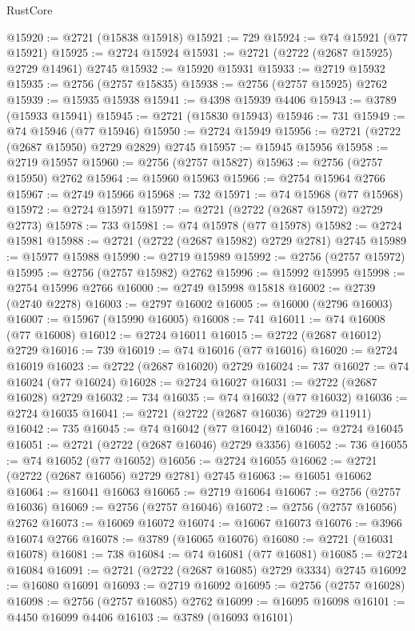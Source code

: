\begin{lexlean}{RustCore}
\begin{coremodule}
@15920 := @2721 (@15838 @15918)
@15921 := 729
@15924 := @74 @15921 (@77 @15921)
@15925 := @2724 @15924
@15931 := @2721 (@2722 (@2687 @15925) @2729 @14961) @2745
@15932 := @15920 @15931
@15933 := @2719 @15932
@15935 := @2756 (@2757 @15835)
@15938 := @2756 (@2757 @15925) @2762
@15939 := @15935 @15938
@15941 := @4398 @15939 @4406
@15943 := @3789 (@15933 @15941)
@15945 := @2721 (@15830 @15943)
@15946 := 731
@15949 := @74 @15946 (@77 @15946)
@15950 := @2724 @15949
@15956 := @2721 (@2722 (@2687 @15950) @2729 @2829) @2745
@15957 := @15945 @15956
@15958 := @2719 @15957
@15960 := @2756 (@2757 @15827)
@15963 := @2756 (@2757 @15950) @2762
@15964 := @15960 @15963
@15966 := @2754 @15964 @2766
@15967 := @2749 @15966
@15968 := 732
@15971 := @74 @15968 (@77 @15968)
@15972 := @2724 @15971
@15977 := @2721 (@2722 (@2687 @15972) @2729 @2773)
@15978 := 733
@15981 := @74 @15978 (@77 @15978)
@15982 := @2724 @15981
@15988 := @2721 (@2722 (@2687 @15982) @2729 @2781) @2745
@15989 := @15977 @15988
@15990 := @2719 @15989
@15992 := @2756 (@2757 @15972)
@15995 := @2756 (@2757 @15982) @2762
@15996 := @15992 @15995
@15998 := @2754 @15996 @2766
@16000 := @2749 @15998 @15818
@16002 := @2739 (@2740 @2278)
@16003 := @2797 @16002
@16005 := @16000 (@2796 @16003)
@16007 := @15967 (@15990 @16005)
@16008 := 741
@16011 := @74 @16008 (@77 @16008)
@16012 := @2724 @16011
@16015 := @2722 (@2687 @16012) @2729
@16016 := 739
@16019 := @74 @16016 (@77 @16016)
@16020 := @2724 @16019
@16023 := @2722 (@2687 @16020) @2729
@16024 := 737
@16027 := @74 @16024 (@77 @16024)
@16028 := @2724 @16027
@16031 := @2722 (@2687 @16028) @2729
@16032 := 734
@16035 := @74 @16032 (@77 @16032)
@16036 := @2724 @16035
@16041 := @2721 (@2722 (@2687 @16036) @2729 @11911)
@16042 := 735
@16045 := @74 @16042 (@77 @16042)
@16046 := @2724 @16045
@16051 := @2721 (@2722 (@2687 @16046) @2729 @3356)
@16052 := 736
@16055 := @74 @16052 (@77 @16052)
@16056 := @2724 @16055
@16062 := @2721 (@2722 (@2687 @16056) @2729 @2781) @2745
@16063 := @16051 @16062
@16064 := @16041 @16063
@16065 := @2719 @16064
@16067 := @2756 (@2757 @16036)
@16069 := @2756 (@2757 @16046)
@16072 := @2756 (@2757 @16056) @2762
@16073 := @16069 @16072
@16074 := @16067 @16073
@16076 := @3966 @16074 @2766
@16078 := @3789 (@16065 @16076)
@16080 := @2721 (@16031 @16078)
@16081 := 738
@16084 := @74 @16081 (@77 @16081)
@16085 := @2724 @16084
@16091 := @2721 (@2722 (@2687 @16085) @2729 @3334) @2745
@16092 := @16080 @16091
@16093 := @2719 @16092
@16095 := @2756 (@2757 @16028)
@16098 := @2756 (@2757 @16085) @2762
@16099 := @16095 @16098
@16101 := @4450 @16099 @4406
@16103 := @3789 (@16093 @16101)

\end{coremodule}
\end{lexlean}
